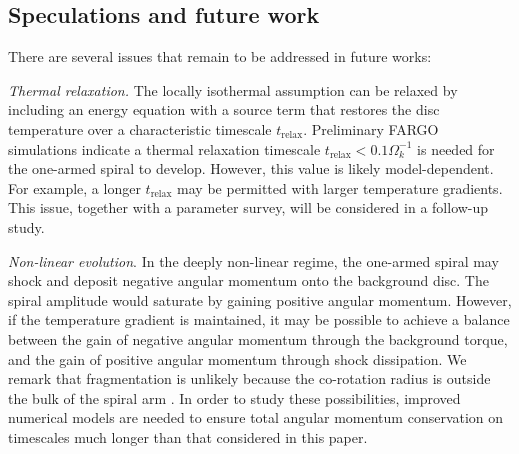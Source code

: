 \subsection{Speculations and future work}

 There are several issues that remain to be addressed in future
  works:  

 \emph{Thermal relaxation.} The locally isothermal assumption 
 can be relaxed by including an energy equation with
 a source term that restores the disc temperature over a
  characteristic timescale $t_\mathrm{relax}$. Preliminary FARGO
simulations indicate a thermal relaxation timescale $t_\mathrm{relax} <
0.1\Omega_k^{-1}$ is needed for the one-armed spiral to
develop. However, this value is likely model-dependent. For example,
a longer $t_\mathrm{relax}$ may be permitted with larger temperature
gradients. This issue, together with a parameter survey, will be
considered in a follow-up study.  


 \emph{Non-linear evolution}. In the deeply non-linear regime, the
one-armed spiral may  
shock and deposit negative angular momentum onto 
the background disc. The spiral amplitude would saturate by gaining
positive angular momentum. However, if the temperature gradient is
maintained, it may be possible to achieve a balance between the gain
of negative angular momentum through the background torque, and the
gain of positive angular momentum through shock dissipation. We remark  
that fragmentation is unlikely because the co-rotation radius is
outside the bulk of the spiral arm \citep{durisen08,rogers12}. In order
to study these possibilities, improved numerical models are needed to
ensure total angular momentum conservation on timescales much longer
than that considered in this paper. 



